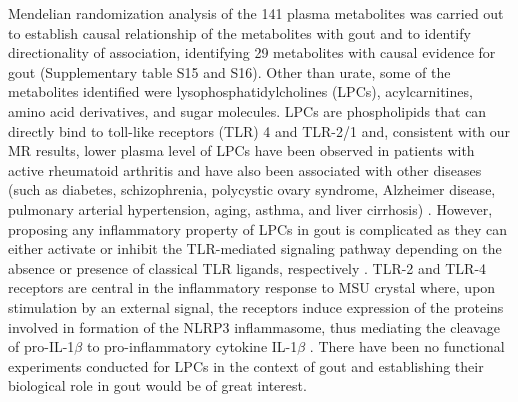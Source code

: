 \documentclass[gucdd,article,submit,pdftex,moreauthors]{Definitions/mdpi}
\begin{document}
Mendelian randomization analysis of the 141 plasma metabolites was carried out to establish causal relationship of the metabolites with gout and to identify directionality of association, identifying 29 metabolites with causal evidence for gout (Supplementary table S15 and S16).
Other than urate, some of the metabolites identified were lysophosphatidylcholines (LPCs), acylcarnitines, amino acid derivatives, and sugar molecules.
LPCs are phospholipids that can directly bind to toll-like receptors (TLR) 4 and TLR-2/1 \citep{carneiro_lysophosphatidylcholine_2013} and, consistent with our MR results, lower plasma level of LPCs have been observed in patients with active rheumatoid arthritis \citep{koh_lipidome_2022,fuchs_phosphatidylcholinelysophosphatidylcholine_2005} and have also been associated with other diseases (such as diabetes, schizophrenia, polycystic ovary syndrome, Alzheimer disease, pulmonary arterial hypertension, aging, asthma, and liver cirrhosis) \citep{knuplez_updated_2020}.
However, proposing any inflammatory property of LPCs in gout is complicated as they can either activate or inhibit the TLR-mediated signaling pathway depending on the absence or presence of classical TLR ligands, respectively \citep{carneiro_lysophosphatidylcholine_2013,knuplez_updated_2020}.
TLR-2 and TLR-4 receptors are central in the inflammatory response to MSU crystal where, upon stimulation by an external signal, the receptors induce expression of the proteins involved in formation of the NLRP3 inflammasome, thus mediating the cleavage of pro-IL-1$\beta$ to pro-inflammatory cytokine IL-1$\beta$ \citep{major_update_2018}.
There have been no functional experiments conducted for LPCs in the context of gout and establishing their biological role in gout would be of great interest.
\end{document}
